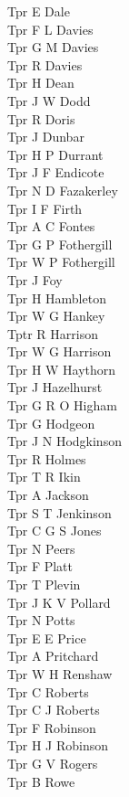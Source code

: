 \begin{multicols}{3}
  Tpr E Dale \\
  Tpr F L Davies \\
  Tpr G M Davies \\
  Tpr R Davies \\
  Tpr H Dean \\
  Tpr J W Dodd \\
  Tpr R Doris \\
  Tpr J Dunbar \\
  Tpr H P Durrant \\
  Tpr J F Endicote \\
  Tpr N D Fazakerley \\
  Tpr I F Firth \\
  Tpr A C Fontes \\
  Tpr G P Fothergill \\
  Tpr W P Fothergill \\
  Tpr J Foy \\
  Tpr H Hambleton \\
  Tpr W G Hankey \\
  Tptr R Harrison \\
  Tpr W G Harrison \\
  Tpr H W Haythorn \\
  Tpr J Hazelhurst \\
  Tpr G R O Higham \\
  Tpr G Hodgeon \\
  Tpr J N Hodgkinson \\
  Tpr R Holmes \\
  Tpr T R Ikin \\
  Tpr A Jackson \\
  Tpr S T Jenkinson \\
  Tpr C G S Jones \\
  Tpr N Peers \\
  Tpr F Platt \\
  Tpr T Plevin \\
  Tpr J K V Pollard \\
  Tpr N Potts \\
  Tpr E E Price \\
  Tpr A Pritchard \\
  Tpr W H Renshaw \\
  Tpr C Roberts \\
  Tpr C J Roberts \\
  Tpr F Robinson \\
  Tpr H J Robinson \\
  Tpr G V Rogers \\
  Tpr B Rowe \\

\end{multicols}
